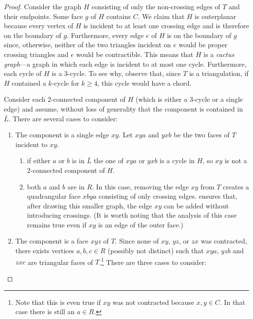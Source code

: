 \documentclass{patmorin}
\begin{document}
\begin{proof}
   Consider the graph $H$ consisting of only the non-crossing edges of $T$
   and their endpoints.  Some face $g$ of $H$ contains $C$.  We claim
   that $H$ is outerplanar because every vertex of $H$ is incident to
   at least one crossing edge and is therefore on the boundary of $g$.
   Furthermore, every edge $e$ of $H$ is on the boundary of $g$ since,
   otherwise, neither of the two triangles incident on $e$ would be proper
   crossing triangles and $e$ would be contractible.  This means that
   $H$ is a \emph{cactus graph}---a graph in which each edge is incident
   to at most one cycle.  Furthermore, each cycle of $H$ is a 3-cycle.
   To see why, observe that, since $T$ is a triangulation, if $H$
   contained a $k$-cycle for $k\ge 4$, this cycle would have a chord.

   Consider each 2-connected component of $H$ (which is either a 3-cycle
   or a single edge) and assume, without loss of generality that the
   component is contained in $\bar L$.  There are several cases to
   consider:
   \begin{enumerate}
	\item The component is a single edge $xy$.  Let $xya$ and $yxb$
	be the two faces of $T$ incident to $xy$.
        \begin{enumerate}
            \item if either $a$ or $b$ is in $\bar L$ the one of $xya$
            or $yxb$ is a cycle in $H$, so $xy$ is not a 2-connected
            component of $H$.  \item both $a$ and $b$ are in $R$.  In this
            case, removing the edge $xy$ from $T$ creates a quadrangular
            face $xbya$ consisting of only crossing edges. 
            ensures that, after drawing this smaller graph, the edge $xy$
            can be added without introducing crossings.  (It is worth
            noting that the analysis of this case remains true even if
            $xy$ is an edge of the outer face.)
        \end{enumerate}
        \item The component is a face $xyz$ of $T$.  Since none of $xy$,
        $yz$, or $zx$ was contracted, there exists vertices $a,b,c\in R$
        (possibly not distinct) such that $xya$, $yzb$ and $zxc$ are
        triangular faces of $T$.\footnote{Note that this is even true if
        $xy$ was not contracted because $x,y\in C$. In that case there
        is still an $a\in R$.}  There are three cases to consider:
        \begin{enumerate}

\end{enumerate}
\end{enumerate}
\end{proof}
\end{document}
